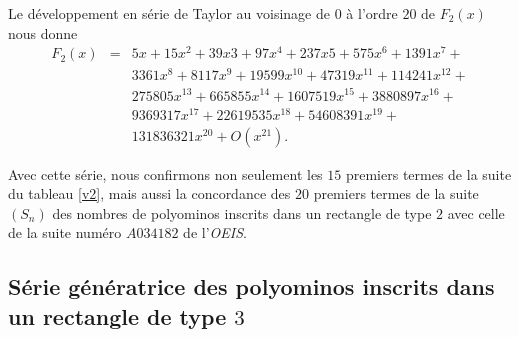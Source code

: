 Le développement  en série de Taylor au voisinage de $0$ à l'ordre $20$ de $F_{2}(x)$ nous donne
\begin{eqnarray*}
F_{2}(x)& = & 5x+15x^2+39x3+97x^4+237x5+575x^6+1391x^7+\\ & & 3361x^8+8117x^9+
19599x^{10}+47319x^{11}+114241x^{12}+\\ & & 275805x^{13}+665855x^{14}+1607519x^{15}+
3880897x^{16}+\\ & & 9369317x^{17}+22619535x^{18}+54608391x^{19}+\\
& & 131836321x^{20}+O(x^{21}).
\end{eqnarray*}

Avec cette série, nous confirmons non seulement les $15$ premiers termes de la suite du tableau \ref{v2}, mais aussi la concordance  des $20$ premiers termes de la suite $(S_{n})$ des nombres de polyominos inscrits dans un rectangle de type $2$ avec celle de la suite numéro $A034182 $ de l'\emph{OEIS}.

\subsection{Série génératrice des polyominos inscrits dans un rectangle de type $3$}

